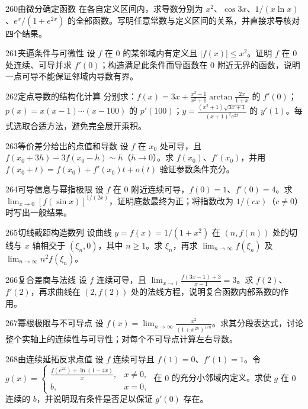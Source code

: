 \begin{exercise}{260}{由微分确定函数}
在各自定义区间内，求导数分别为 $x^2$、$\cos3x$、$1/(x\ln x)$、$e^x/(1+e^{2x})$ 的全部函数。写明任意常数与定义区间的关系，并直接求导核对四个结果。
\end{exercise}
\begin{exercise}{261}{夹逼条件与可微性}
设 $f$ 在 $0$ 的某邻域内有定义且 $|f(x)|\le x^2$。证明 $f$ 在 $0$ 处连续、可导并求 $f'(0)$；构造满足此条件而导函数在 $0$ 附近无界的函数，说明一点可导不能保证邻域内导数有界。
\end{exercise}
\begin{exercise}{262}{定点导数的结构化计算}
分别求：$f(x)=3x+\frac{x^2-1}{x^2+1}\arctan\frac{2x}{1+x}$ 的 $f'(0)$；$p(x)=x(x-1)\cdots(x-100)$ 的 $p'(100)$；$y=\frac{(x^2+1)\sqrt{3x+1}}{(x+1)^2e^{2x}}$ 的 $y'(1)$。每式选取合适方法，避免完全展开乘积。
\end{exercise}
\begin{exercise}{263}{等价差分给出的点值和导数}
设 $f$ 在 $x_0$ 处可导，且 $f(x_0+3h)-3f(x_0-h)\sim h$（$h\to0$）。求 $f(x_0)$、$f'(x_0)$，并用 $f(x_0+t)=f(x_0)+f'(x_0)t+o(t)$ 验证参数条件充分。
\end{exercise}
\begin{exercise}{264}{可导信息与幂指极限}
设 $f$ 在 $0$ 附近连续可导，$f(0)=1$、$f'(0)=4$。求 $\lim_{x\to0}[f(\sin x)]^{1/(2x)}$，证明底数最终为正；将指数改为 $1/(cx)$（$c\ne0$）时写出一般结果。
\end{exercise}
\begin{exercise}{265}{切线截距构造数列}
设曲线 $y=f(x)=1/(1+x^2)$ 在 $(n,f(n))$ 处的切线与 $x$ 轴相交于 $(\xi_n,0)$，其中 $n\ge1$。求 $\xi_n$，再求 $\lim_{n\to\infty}f(\xi_n)$ 及 $\lim_{n\to\infty}n^2f(\xi_n)$。
\end{exercise}
\begin{exercise}{266}{复合差商与法线}
设 $f$ 连续可导，且 $\lim_{x\to1}\frac{f(3x-1)+3}{x-1}=3$。求 $f(2)$、$f'(2)$，再求曲线在 $(2,f(2))$ 处的法线方程，说明复合函数内部系数的作用。
\end{exercise}
\begin{exercise}{267}{幂根极限与不可导点}
设 $f(x)=\lim_{n\to\infty}\frac{x^2}{(1+x^{2n})^{1/n}}$。求其分段表达式，讨论整个实轴上的连续性与可导性；对每个不可导点计算左右导数。
\end{exercise}
\begin{exercise}{268}{由连续延拓反求点值}
设 $f$ 连续可导且 $f(1)=0$、$f'(1)=1$。令 $g(x)=\begin{cases}\frac{f(e^{2x})+\ln(1-4x)}x,&x\ne0,\\b,&x=0,\end{cases}$ 在 $0$ 的充分小邻域内定义。求使 $g$ 在 $0$ 连续的 $b$，并说明现有条件是否足以保证 $g'(0)$ 存在。
\end{exercise}
